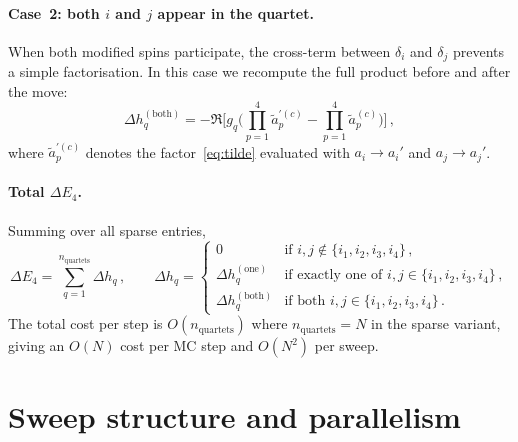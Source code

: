 \documentclass[11pt,a4paper]{article}
\begin{document}
\paragraph{Case~2: both $i$ and $j$ appear in the quartet.}
When both modified spins participate, the cross-term between $\delta_i$ and
$\delta_j$ prevents a simple factorisation.  In this case we recompute the
full product before and after the move:
\begin{equation}\label{eq:dE4_both}
  \Delta h_q^{(\mathrm{both})} = -\Re\!\Biggl[
    g_q\!\Biggl(
      \prod_{p=1}^{4} \tilde a_p^{\prime(c)}
    - \prod_{p=1}^{4} \tilde a_p^{(c)}
    \Biggr)
  \Biggr]\,,
\end{equation}
where $\tilde a_p^{\prime(c)}$ denotes the factor~\eqref{eq:tilde} evaluated
with $a_i \to a_i'$ and $a_j \to a_j'$.

\paragraph{Total $\Delta E_4$.}
Summing over all sparse entries,
\begin{equation}\label{eq:dE4_total}
  \Delta E_4 = \sum_{q=1}^{n_{\mathrm{quartets}}} \Delta h_q \,,\qquad
  \Delta h_q =
    \begin{cases}
      0                              & \text{if } i,j \notin \{i_1,i_2,i_3,i_4\}\,,\\
      \Delta h_q^{(\mathrm{one})}    & \text{if exactly one of } i,j \in \{i_1,i_2,i_3,i_4\}\,,\\
      \Delta h_q^{(\mathrm{both})}   & \text{if both } i,j \in \{i_1,i_2,i_3,i_4\}\,.
    \end{cases}
\end{equation}
The total cost per step is $O(n_{\mathrm{quartets}})$ where
$n_{\mathrm{quartets}} = N$ in the sparse variant, giving an $O(N)$ cost
per MC step and $O(N^2)$ per sweep.

\section{Sweep structure and parallelism}
\end{document}
